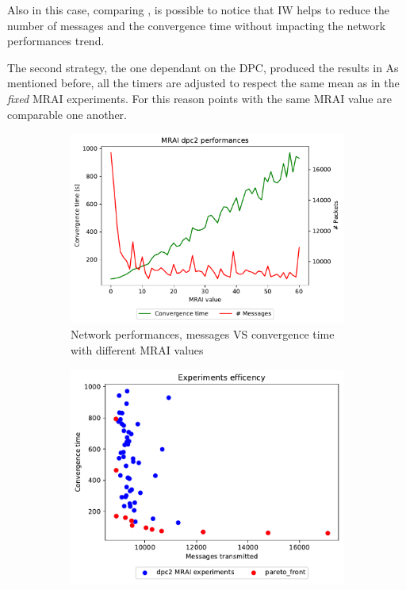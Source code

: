 Also in this case, comparing ,
is possible to notice that \ac{IW}
helps to reduce the number of messages and the convergence time without impacting
the network performances trend.

The second strategy, the one dependant on the \ac{DPC}, produced the results
in 
As mentioned before, all the timers are adjusted to respect the same mean as in 
the \textit{fixed} \ac{MRAI} experiments.
For this reason points with the same \ac{MRAI} value are comparable one another.

\begin{figure}[h]
     \centering
     \begin{subfigure}[b]{0.45\textwidth}
         \centering
         \includegraphics[width=\textwidth]{images/internet_like/1000/dpc/internet_like-DPC_mrai_evolution.pdf}
		 \caption{Network performances, messages VS convergence time with different
			\ac{MRAI} values}
         \label{fig:internt_like_1000_DPC_evolution_evolution}
     \end{subfigure}
     \hfill
     \begin{subfigure}[b]{0.45\textwidth}
         \centering
         \includegraphics[width=\textwidth]{images/internet_like/1000/dpc/internet_like-DPC.pdf}

\end{subfigure}
\end{figure}
